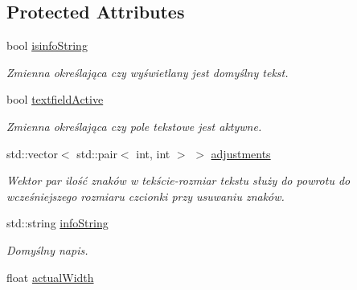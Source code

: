 \subsection*{Protected Attributes}
\begin{DoxyCompactItemize}
\item 
\mbox{\label{class_contain_text_ac19642be69760495fd933ee2fab7567e}} 
bool \mbox{\hyperlink{class_contain_text_ac19642be69760495fd933ee2fab7567e}{isinfo\+String}}
\begin{DoxyCompactList}\small\item\em Zmienna określająca czy wyświetlany jest domyślny tekst. \end{DoxyCompactList}\item 
\mbox{\label{class_contain_text_a281d9d33f682d71068e579216e123f4e}} 
bool \mbox{\hyperlink{class_contain_text_a281d9d33f682d71068e579216e123f4e}{textfield\+Active}}
\begin{DoxyCompactList}\small\item\em Zmienna określająca czy pole tekstowe jest aktywne. \end{DoxyCompactList}\item 
\mbox{\label{class_contain_text_ad7dd7594a28cd59c44cd40b4413b4f84}} 
std\+::vector$<$ std\+::pair$<$ int, int $>$ $>$ \mbox{\hyperlink{class_contain_text_ad7dd7594a28cd59c44cd40b4413b4f84}{adjustments}}
\begin{DoxyCompactList}\small\item\em Wektor par ilość znaków w tekście-\/rozmiar tekstu służy do powrotu do wcześniejszego rozmiaru czcionki przy usuwaniu znaków. \end{DoxyCompactList}\item 
\mbox{\label{class_contain_text_a54eb4616b2a2ede8e6b2ef020239687e}} 
std\+::string \mbox{\hyperlink{class_contain_text_a54eb4616b2a2ede8e6b2ef020239687e}{info\+String}}
\begin{DoxyCompactList}\small\item\em Domyślny napis. \end{DoxyCompactList}\item 
\mbox{\label{class_contain_text_a547b80d0d48ad7830ed220e9052e2c0a}} 
float \mbox{\hyperlink{class_contain_text_a547b80d0d48ad7830ed220e9052e2c0a}{actual\+Width}}

\end{DoxyCompactItemize}
